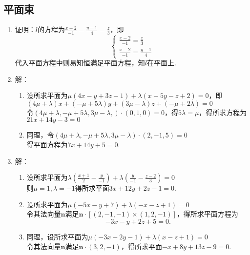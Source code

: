 \documentclass[UTF8]{ctexart}
\begin{document}
\subsection{平面束}
\begin{enumerate}
\item 证明：$l$的方程为$\displaystyle\frac{x-2}{-1}=\displaystyle\frac{y-1}{4}=\displaystyle\frac{z}{3}$，即$$\left\{\begin{array}{l}\displaystyle\frac{x-2}{-1}=\displaystyle\frac{z}{3}\\\displaystyle\frac{x-2}{-1}=\displaystyle\frac{y-1}{4}\end{array}\right.$$代入平面方程中则易知恒满足平面方程，知$l$在平面\uppercase\expandafter{}上. 

\item 解：\begin{enumerate}[(1)]
\item 设所求平面为$\mu\left(4x-y+3z-1\right)+\lambda\left(x+5y-z+2\right)=0$，即$\left(4\mu+\lambda\right)x+\left(-\mu+5\lambda\right)y+\left(3\mu-\lambda\right)z+\left(-\mu+2\lambda\right)=0$\\
令$\left(4\mu+\lambda,-\mu+5\lambda,3\mu-\lambda,\right)\cdot\left(0,1,0\right)=0$，得$5\lambda=\mu$，得所求方程为$21x+14y-3=0$
\item 同理，令$\left(4\mu+\lambda,-\mu+5\lambda,3\mu-\lambda\right)\cdot\left(2,-1,5\right)=0$\\
得平面方程为$7x+14y+5=0.$
\end{enumerate}

\item 解：\begin{enumerate}[(1)]
\item 设所求平面为$\lambda\left(\displaystyle\frac{x+1}{2}-\displaystyle\frac{y}{-1}\right)+\lambda\left(\displaystyle\frac{y}{-1}-\displaystyle\frac{z-2}{3}\right)=0$\\
则$\mu=1,\lambda=-1$得所求平面$3x+12y+2z-1=0$.
\item 设所求平面为$\mu\left(-5x-y+7\right)+\lambda\left(-x-z+1\right)=0$\\
令其法向量$\mathbf{n}$满足$\mathbf{n}\cdot\left[\left(2,-1,-1\right)\times\left(1,2,-1\right)\right]$，得所求平面方程为$$-3x-y+2z+5=0.$$
\item 同理，设所求平面为$\mu\left(-3x-2y-1\right)+\lambda\left(x-z+1\right)=0$\\令其法向量$\mathbf{n}$满足$\mathbf{n}\cdot\left(3,2,-1\right)$，得所求平面$-x+8y+13z-9=0$.
\end{enumerate}


\end{enumerate}
\end{document}
